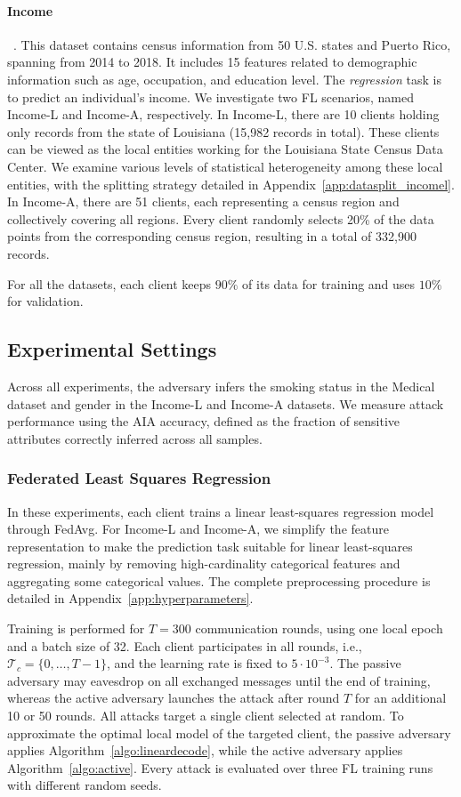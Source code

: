 \paragraph{Income}~\cite{income_dataset}. This dataset contains census information from 50 U.S. states and Puerto Rico, spanning from 2014 to 2018. It includes 15 features related to demographic information such as age, occupation, and education level.
The \emph{regression} task is to predict an individual's income. 
We investigate two FL scenarios, named \mbox{Income-L} and Income-A, respectively. In Income-L, there are 10 clients holding only records from the  state of Louisiana (15,982 records in total). These clients can be viewed as the local entities working for the Louisiana State Census Data Center. We examine various levels of statistical heterogeneity among these local entities, with the splitting strategy detailed in Appendix~\ref{app:datasplit_incomel}. In Income-A, there are 51 clients, each representing a census region and collectively covering all regions. Every client randomly selects 20\% of the data points from the corresponding census region, resulting in a total of 332,900 records.

For all the datasets, each client keeps $90\%$ of its data for training and uses $10\%$ for validation.

\subsection{Experimental Settings}
Across all experiments, the adversary infers the smoking status in the Medical dataset and gender in the Income-L and Income-A datasets. We measure attack performance using the AIA accuracy, defined as the fraction of sensitive attributes correctly inferred across all samples.

\subsubsection{Federated Least Squares Regression}
In these experiments, each client trains a linear least-squares regression model through FedAvg. For Income-L and Income-A, we simplify the feature representation to make the prediction task suitable for linear least-squares regression, mainly by removing high-cardinality categorical features and aggregating some categorical values. The complete preprocessing procedure is detailed in Appendix~\ref{app:hyperparameters}.

Training is performed for $T=300$ communication rounds, using one local epoch and a batch size of 32. Each client participates in all rounds, i.e., $\mathcal{T}_c=\{0,\ldots,T-1\}$, and the learning rate is fixed to $5\cdot10^{-3}$. The passive adversary may eavesdrop on all exchanged messages until the end of training, whereas the active adversary launches the attack after round $T$ for an additional 10 or 50 rounds. All attacks target a single client selected at random. To approximate the optimal local model of the targeted client, the passive adversary applies Algorithm~\ref{algo:lineardecode}, while the active adversary applies Algorithm~\ref{algo:active}. Every attack is evaluated over three FL training runs with different random seeds.

